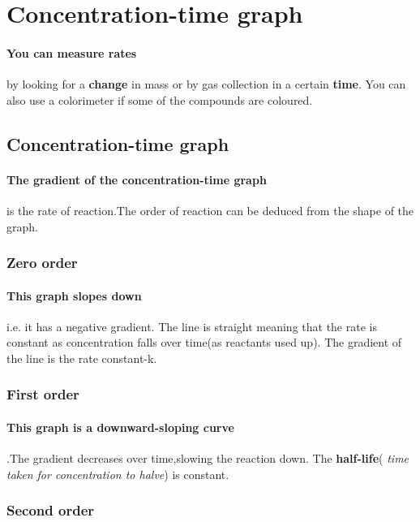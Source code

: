 \section{Concentration-time graph}
\paragraph{You can measure rates}by looking for a \textbf{change} in mass or by gas collection in a certain \textbf{time}. You can also use a colorimeter if some of the compounds are coloured.
\subsection{Concentration-time graph}
\paragraph{The gradient of the concentration-time graph} is the rate of reaction.The order of reaction can be deduced from the shape of the graph.
\subsubsection{Zero order}
\paragraph{This graph slopes down}i.e. it has a negative gradient. The line is straight meaning that the rate is constant as concentration falls over time(as reactants used up). The gradient of the line is the rate constant-k.
\subsubsection{First order}
\paragraph{This graph is a downward-sloping curve}.The gradient decreases over time,slowing the reaction down. The \textbf{half-life}( \textit{time taken for concentration to halve}) is constant.
\subsubsection{Second order}
